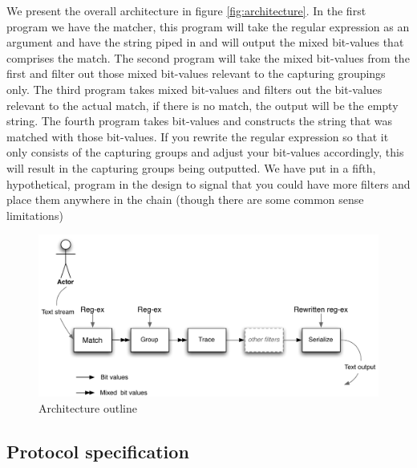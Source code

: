 We present the overall architecture in figure
\vref{fig:architecture}. In the first program we have the matcher,
this program will take the regular expression as an argument and have
the string piped in and will output the mixed bit-values that
comprises the match. The second program will take the mixed bit-values
from the first and filter out those mixed bit-values relevant to the
capturing groupings only. The third program takes mixed bit-values and
filters out the bit-values relevant to the actual match, if there is
no match, the output will be the empty string. The fourth program
takes bit-values and constructs the string that was matched with those
bit-values. If you rewrite the regular expression so that it only
consists of the capturing groups and adjust your bit-values
accordingly, this will result in the capturing groups being
outputted. We have put in a fifth, hypothetical, program in the design to signal that
you could have more filters and place them anywhere in the chain (though there are some common sense limitations)
\begin{figure}
  \centering
  \includegraphics[width=\textwidth]{design/architecture.pdf}
  \caption{Architecture outline}
  \label{fig:architecture}
\end{figure}


 

\subsection{Protocol specification}
\label{sec:protocol_spec}

